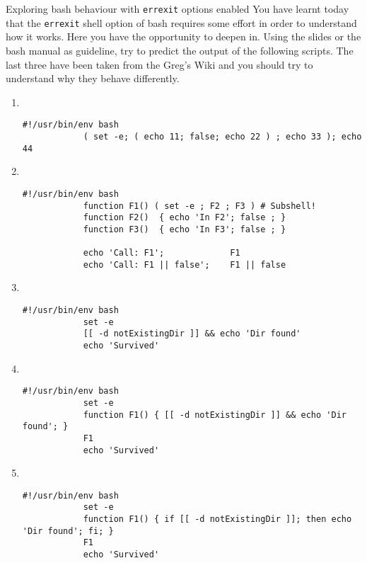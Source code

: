 
\begin{exercise}[Instructive]{Exploring bash behaviour with \texttt{errexit} options enabled}
    You have learnt today that the \texttt{errexit} shell option of bash requires some effort in order to understand how it works.
    Here you have the opportunity to deepen in.
    Using the slides or the bash manual as guideline, try to predict the output of the following scripts.
    The last three have been taken from the Greg's Wiki and you should try to understand why they behave differently.
    \begin{enumerate}
        \item ~
        \begin{lstlisting}[style=myBash, numbers=none]
            #!/usr/bin/env bash
            ( set -e; ( echo 11; false; echo 22 ) ; echo 33 ); echo 44
        \end{lstlisting}
        \item ~
        \begin{lstlisting}[style=myBash, numbers=none]
            #!/usr/bin/env bash
            function F1() ( set -e ; F2 ; F3 ) # Subshell!
            function F2()  { echo 'In F2'; false ; }
            function F3()  { echo 'In F3'; false ; }

            echo 'Call: F1';             F1
            echo 'Call: F1 || false';    F1 || false
        \end{lstlisting}
        \item ~
        \begin{lstlisting}[style=myBash, numbers=none]
            #!/usr/bin/env bash
            set -e
            [[ -d notExistingDir ]] && echo 'Dir found'
            echo 'Survived'
        \end{lstlisting}
        \item ~
        \begin{lstlisting}[style=myBash, numbers=none]
            #!/usr/bin/env bash
            set -e
            function F1() { [[ -d notExistingDir ]] && echo 'Dir found'; }
            F1
            echo 'Survived'
        \end{lstlisting}
        \item ~
        \begin{lstlisting}[style=myBash, numbers=none]
            #!/usr/bin/env bash
            set -e
            function F1() { if [[ -d notExistingDir ]]; then echo 'Dir found'; fi; }
            F1
            echo 'Survived'
        \end{lstlisting}
    \end{enumerate}
\end{exercise}